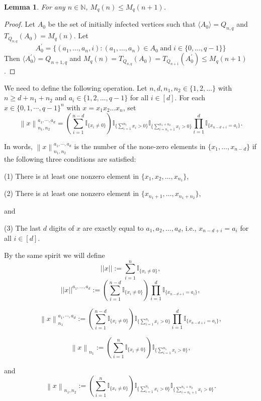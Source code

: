 \documentclass[reqno,11pt]{amsart}
\newtheorem{lemma}[theorem]{Lemma}
\renewcommand{\leq}{\leqslant}
\renewcommand{\geq}{\geqslant}
\begin{document}
\begin{lemma}
For any $n \in \mathbb{N}$, $M_{q}(n) \leq M_q(n+1)$. 
\end{lemma}

\begin{proof}
Let $A_0$ be the set of initially infected vertices such that $\langle A_0 \rangle =Q_{n,q}$ and $T_{Q_{n,q}}(A_0)=M_q(n)$. Let 
$$A_0^{'}=\{(a_1,\dots,a_n,i):(a_1,\dots,a_n) \in A_0 \; \text{and} \;i \in \{0,\dots,q-1\}\}$$
Then $\langle A_0^{'} \rangle=Q_{n+1,q}$ and $M_q(n)=T_{Q_{n,q}}(A_0)=T_{Q_{n+1}}(A_0^{'}) \leq M_{q}(n+1)$.
\end{proof}


We need to define the following operation. Let $n, d,n_1, n_2 \in \{1,2,\dots\}$ with $n \geq d+n_1+n_2$ and $a_i \in \{1,2,\dots,q-1\}$ for all $i \in [d]$. For each $x \in \{0,1,\cdots,q-1\}^n$ with $x=x_1x_2\dots x_n$, set
$$\left \lVert x \right \rVert_{n_1,n_2}^{a_1,\cdots,a_d}=\left(\sum_{i=1}^{n-d}\mathbb{I}_{\{x_i \neq 0\}} \right)\mathbb{I}_{\{\sum_{i=1}^{n_1}x_i >0\}} \mathbb{I}_{\{\sum_{i=n_1+1}^{n_1+n_2}x_i >0\}}\prod_{i=1}^d \mathbb{I}_{\{x_{n-d+i}=a_i\}}.$$

In words, $\left \lVert x \right \rVert_{n_1,n_2}^{a_1,\cdots,a_d}$ is the number of the none-zero elements in $\{x_1,\dots,x_{n-d}\}$ if the following three conditions are satisfied:

(1) There is at least one nonzero element in $\{x_1,x_2,\dots,x_{n_1}\}$,

(2) There is at least one nonzero  element in $\{x_{n_1+1},\dots,x_{n_1+n_2}\}$,

and

(3) The last $d$ digits of $x$ are exactly equal to $a_1,a_2,\dots,a_d$, i.e.,
$x_{n-d+i}=a_i$ for all $i \in [d]$. 

By the same spirit we will define 
$$||x||:=\sum_{i=1}^{n}\mathbb{I}_{\{x_i \neq 0\}},$$
$$||x||^{a_1,\dots,a_d}:=\left(\sum_{i=1}^{n-d}\mathbb{I}_{\{x_i \neq 0\}} \right)\prod_{i=1}^d \mathbb{I}_{\{x_{n-d+i}=a_i\}},$$

$$\left \lVert x \right \rVert_{n_1}^{a_1,\cdots,a_d}:=\left(\sum_{i=1}^{n-d}\mathbb{I}_{\{x_i \neq 0\}} \right)\mathbb{I}_{\{\sum_{i=1}^{n_1}x_i >0\}} \prod_{i=1}^d \mathbb{I}_{\{x_{n-d+i}=a_i\}},$$

$$\left \lVert x \right \rVert_{n_1}:=\left(\sum_{i=1}^{n}\mathbb{I}_{\{x_i \neq 0\}} \right)\mathbb{I}_{\{\sum_{i=1}^{n_1}x_i >0\}},$$


and 
$$\left \lVert x \right \rVert_{n_1,n_2}:=\left(\sum_{i=1}^{n}\mathbb{I}_{\{x_i \neq 0\}} \right)\mathbb{I}_{\{\sum_{i=1}^{n_1}x_i >0\}} \mathbb{I}_{\{\sum_{i=n_1+1}^{n_1+n_2}x_i >0\}}.$$
\end{document}
